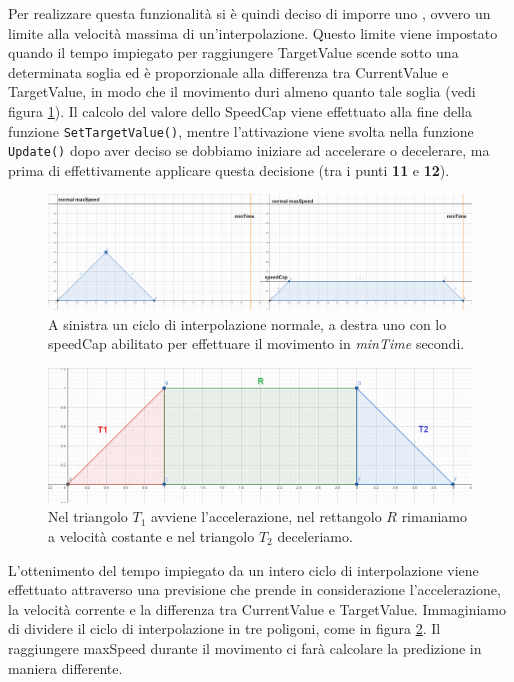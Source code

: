 \documentclass[main.tex]{subfiles}
\begin{document}
Per realizzare questa funzionalità si è quindi deciso di imporre uno , ovvero un limite alla velocità massima di un'interpolazione. Questo limite viene impostato quando il tempo impiegato per raggiungere TargetValue scende sotto una determinata soglia ed è proporzionale alla differenza tra CurrentValue e TargetValue, in modo che il movimento duri almeno quanto tale soglia (vedi figura \ref{fig:4_speedCapIntro}). Il calcolo del valore dello SpeedCap viene effettuato alla fine della funzione \lstinline{SetTargetValue()}, mentre l'attivazione viene svolta nella funzione \lstinline{Update()} dopo aver deciso se dobbiamo iniziare ad accelerare o decelerare, ma prima di effettivamente applicare questa decisione (tra i punti \textbf{11} e \textbf{12}). \newline
\begin{figure}[H]
    \centering
    \includegraphics[width=1\linewidth]{img/interpolazione/speedCapIntro.png}
    \caption{A sinistra un ciclo di interpolazione normale, a destra uno con lo speedCap abilitato per effettuare il movimento in \textit{minTime} secondi.}
    \label{fig:4_speedCapIntro}
\end{figure}

\begin{figure}
    \centering
    \captionsetup{justification=centering}
    \includegraphics[scale=0.25]{img/interpolazione/movementThreeParts.png}
    \caption{Nel triangolo $T_1$ avviene l'accelerazione, nel rettangolo $R$ rimaniamo a velocità costante e nel triangolo $T_2$ deceleriamo.}
    \label{fig:4_movementThreeParts}
\end{figure}
\noindent L'ottenimento del tempo impiegato da un intero ciclo di interpolazione viene effettuato attraverso una previsione che prende in considerazione l'accelerazione, la velocità corrente e la differenza tra CurrentValue e TargetValue. Immaginiamo di dividere il ciclo di interpolazione in tre poligoni, come in figura \ref{fig:4_movementThreeParts}. Il raggiungere maxSpeed durante il movimento ci farà calcolare la predizione in maniera differente. \newline
\end{document}

